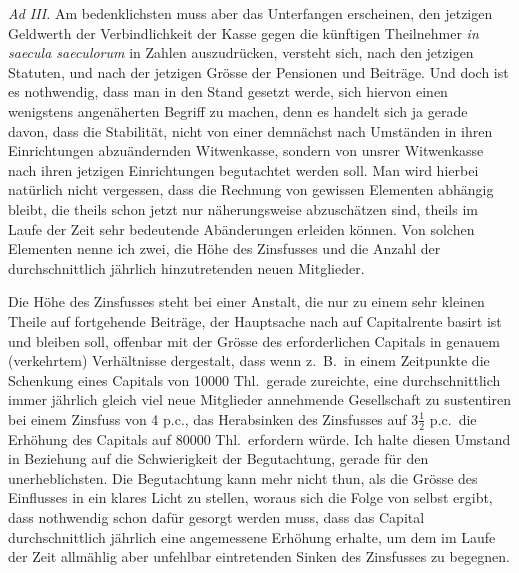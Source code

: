 \documentclass[12pt,a4paper]{article}
\begin{document}
\textit{Ad III.} Am bedenklichsten muss aber das Unterfangen erscheinen, den jetzigen Geldwerth der Verbindlichkeit der Kasse gegen die k\"unftigen Theilnehmer \textit{in saecula saeculorum} in Zahlen auszudr\"ucken, versteht sich, nach den jetzigen Statuten, und nach der jetzigen Gr\"osse der Pensionen und Beitr\"age. Und doch ist es nothwendig, dass man in den Stand gesetzt werde, sich hiervon einen wenigstens angen\"aherten Begriff zu machen, denn es handelt sich ja gerade davon, dass die Stabilit\"at, nicht von einer demn\"achst nach Umst\"anden in ihren Einrichtungen abzu\"andernden Witwenkasse, sondern von unsrer Witwenkasse nach ihren jetzigen Einrichtungen begutachtet werden soll. Man wird hierbei nat\"urlich nicht vergessen, dass die Rechnung von gewissen Elementen abh\"angig bleibt, die theils schon jetzt nur n\"aherungsweise abzusch\"atzen sind, theils im Laufe der Zeit sehr bedeutende Ab\"anderungen erleiden k\"onnen. Von solchen Elementen nenne ich zwei, die H\"ohe des Zinsfusses und die Anzahl der durchschnittlich j\"ahrlich hinzutretenden neuen Mitglieder.

Die H\"ohe des Zinsfusses steht bei einer Anstalt, die nur zu einem sehr kleinen Theile auf fortgehende Beitr\"age, der Hauptsache nach auf Capitalrente basirt ist und bleiben soll, offenbar mit der Gr\"osse des erforderlichen Capitals in genauem (verkehrtem) Verh\"altnisse dergestalt, dass wenn z.\ B.\ in einem Zeitpunkte die Schenkung eines Capitals von 10000 Thl.\ gerade zureichte, eine durchschnittlich immer j\"ahrlich gleich viel neue Mitglieder annehmende Gesellschaft zu sustentiren bei einem Zinsfuss von 4 p.c., das Herabsinken des Zinsfusses auf $3\frac{1}{2}$ p.c.\ die Erh\"ohung des Capitals auf 80000 Thl.\ erfordern w\"urde. Ich halte diesen Umstand in Beziehung auf die Schwierigkeit der Begutachtung, gerade f\"ur den unerheblichsten. Die Begutachtung kann mehr nicht thun, als die Gr\"osse des Einflusses in ein klares Licht zu stellen, woraus sich die Folge von selbst ergibt, dass nothwendig schon daf\"ur gesorgt werden muss, dass das Capital durchschnittlich j\"ahrlich eine angemessene Erh\"ohung erhalte, um dem im Laufe der Zeit allm\"ahlig aber unfehlbar eintretenden Sinken des Zinsfusses zu begegnen.
\end{document}
